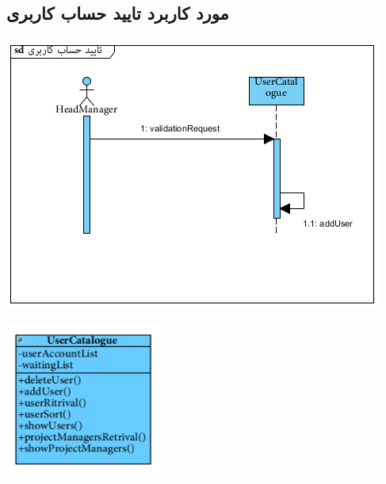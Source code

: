 \newpage
\vspace{2cm}
\subsection*{مورد کاربرد تایید حساب کاربری}
\vspace{2cm}
\begin{center}
\includegraphics[width=\textwidth]{SequenceDiagrams/6.png}
\end{center}

\newpage
\vspace{2cm}
\begin{center}
\includegraphics[width=0.4\textwidth]{SequenceClasses/6.png}
\end{center}

\newpage
\vspace{2cm}

